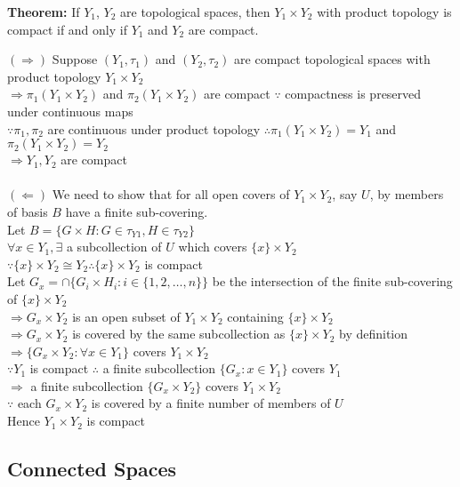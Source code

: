 \documentclass{article}
\begin{document}
\textbf{Theorem:} If $Y_1$, $Y_2$ are topological spaces, then $Y_1 \times Y_2$ with product topology is compact if and only if $Y_1$ and $Y_2$ are compact.
\begin{tcolorbox}[colback=lightgray!10,colframe=lightgray!10, fontupper=\linespread{1.5}\selectfont]
	$(\Rightarrow)$ Suppose $(Y_1, \tau_1)$ and $(Y_2, \tau_2)$ are compact topological spaces with product topology $Y_1 \times Y_2$ \\
	$\Rightarrow \pi_1(Y_1 \times Y_2)$ and $\pi_2(Y_1 \times Y_2)$ are compact $\because$ compactness is preserved under continuous maps \\
	$\because \pi_1, \pi_2$ are continuous under product topology $\therefore \pi_1(Y_1 \times Y_2) = Y_1$ and $\pi_2(Y_1 \times Y_2) = Y_2$ \\
	$\Rightarrow Y_1, Y_2$ are compact \\\\
	$(\Leftarrow)$ We need to show that for all open covers of $Y_1 \times Y_2$, say $U$, by members of basis $B$ have a finite sub-covering. \\
	Let $B = \{G \times H: G \in \tau_{Y1}, H \in \tau_{Y2}\}$ \\
	$\forall x \in Y_1, \exists$ a subcollection of $U$ which covers $\{x\} \times Y_2$ \\
	$\because \{x\} \times Y_2 \cong Y_2 \therefore \{x\} \times Y_2$ is compact \\
	Let $G_x = \cap \{G_i \times H_i: i \in \{1,2,\dots,n\}\}$ be the intersection of the finite sub-covering of $\{x\} \times Y_2$ \\
	$\Rightarrow G_x \times Y_2$ is an open subset of $Y_1 \times Y_2$ containing $\{x\} \times Y_2$ \\
	$\Rightarrow G_x \times Y_2$ is covered by the same subcollection as $\{x\} \times Y_2$ by definition \\
	$\Rightarrow \{G_x \times Y_2: \forall x \in Y_1\}$ covers $Y_1 \times Y_2$ \\
	$\because Y_1$ is compact $\therefore$ a finite subcollection $\{G_x: x \in Y_1\}$ covers $Y_1$ \\
	$\Rightarrow$ a finite subcollection $\{G_x \times Y_2\}$ covers $Y_1 \times Y_2$ \\
	$\because$ each $G_x \times Y_2$ is covered by a finite number of members of $U$ \\
	Hence $Y_1 \times Y_2$ is compact
\end{tcolorbox}

\subsection{Connected Spaces}
\end{document}
